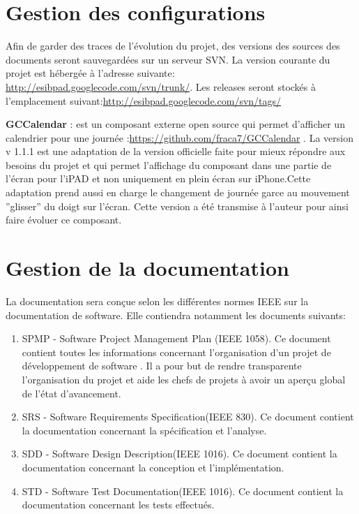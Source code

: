 \section{Gestion des configurations}
Afin de garder des traces de l'évolution du projet, des versions des sources des documents seront sauvegardées sur un serveur \gls{SVN}. La version courante du projet est hébergée à l'adresse suivante: \url{http://esibpad.googlecode.com/svn/trunk/}. Les releases seront stockés  à l'emplacement suivant:\url{http://esibpad.googlecode.com/svn/tags/} 

	 
\textbf{GCCalendar} : est un composant externe open source qui permet d'afficher un calendrier pour une journée :\url{https://github.com/fraca7/GCCalendar} . La version  v 1.1.1 est une adaptation de la version officielle faite pour mieux répondre aux besoins du projet et qui permet l'affichage du composant dans une partie de l'écran pour l'iPAD et non uniquement en plein écran sur iPhone.Cette adaptation prend aussi en charge le changement de journée garce au mouvement ''glisser'' du doigt sur l'écran. Cette version a été transmise à l'auteur pour ainsi faire évoluer ce composant.

\section{Gestion de la documentation}
 La documentation sera conçue selon les différentes normes IEEE sur la documentation de software. Elle contiendra notamment les documents suivants:

\begin{enumerate}
	\item \gls{SPMP} - Software Project Management Plan (IEEE 1058).  Ce document contient toutes les informations concernant l'organisation d'un projet de développement de software . Il a pour but de rendre transparente l'organisation du projet et aide les chefs de projets à avoir un aperçu global de l'état d'avancement.
	\item \gls{SRS} - Software Requirements Specification(IEEE 830). Ce document contient la documentation concernant la spécification et l'analyse.
	\item \gls{SDD} - Software Design Description(IEEE 1016). Ce document contient la documentation concernant la conception  et l'implémentation.
	\item \gls{STD} - Software Test Documentation(IEEE 1016). Ce document contient la documentation concernant les tests effectués.
\end{enumerate}	

